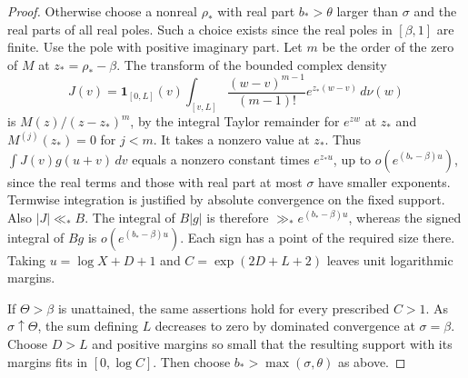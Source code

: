 \begin{proof}
Otherwise choose a nonreal \(\rho_*\) with real part \(b_*>\theta\)
larger than \(\sigma\) and the real parts of all real poles. Such a
choice exists since the real poles in \([\beta,1]\) are finite.
Use the pole with positive imaginary part. Let \(m\) be the order
of the zero of \(M\) at \(z_*=\rho_*-\beta\). The transform of the
bounded complex density
\[
 J(v)=\mathbf1_{[0,L]}(v)\int_{[v,L]}
      \frac{(w-v)^{m-1}}{(m-1)!}e^{z_*(w-v)}\,d\nu(w)
\]
is \(M(z)/(z-z_*)^m\), by the integral Taylor remainder for
\(e^{zw}\) at \(z_*\) and \(M^{(j)}(z_*)=0\) for \(j<m\).
It takes a nonzero value at \(z_*\).
Thus \(\int J(v)g(u+v)\,dv\) equals a nonzero constant times
\(e^{z_*u}\), up to \(o(e^{(b_*-\beta)u})\), since the real
terms and those with real part at most \(\sigma\) have smaller
exponents. Termwise integration is justified by absolute convergence
on the fixed support. Also \(|J|\ll_* B\). The integral of
\(B|g|\) is therefore \(\gg_*e^{(b_*-\beta)u}\), whereas the
signed integral of \(Bg\) is \(o(e^{(b_*-\beta)u})\). Each sign
has a point of the required size there. Taking \(u=\log X+D+1\)
and \(C=\exp(2D+L+2)\) leaves unit logarithmic margins.

If \(\Theta>\beta\) is unattained, the same assertions hold for
every prescribed \(C>1\). As \(\sigma\uparrow\Theta\), the sum
defining \(L\) decreases to zero by dominated convergence at
\(\sigma=\beta\). Choose \(D>L\) and positive margins so small
that the resulting support with its margins fits in \([0,\log C]\).
Then choose \(b_*>\max(\sigma,\theta)\) as above.
\end{proof}

